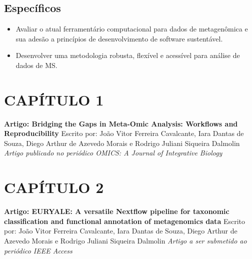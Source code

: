 \documentclass[
	12pt,				%
	oneside,			%
	a4paper,			%
	chapter=TITLE,		%
	section=TITLE,		%
	english,			%
	brazil				%
	]{abntex2}
\begin{document}
\section{Específicos}\label{especuxedficos}
\begin{itemize}
\tightlist
\item
  Avaliar o atual ferramentário computacional para dados de metagenômica e sua adesão a princípios de desenvolvimento de software sustentável.
\item
  Desenvolver uma metodologia robusta, flexível e acessível para análise de dados de \gls{MS}.
\end{itemize}
\chapter*{CAPÍTULO 1}\label{cap1}
\begin{center}
\textbf{Artigo: Bridging the Gaps in Meta-Omic Analysis: Workflows and Reproducibility}
\bigskip\newline
Escrito por: João Vitor Ferreira Cavalcante, Iara Dantas de Souza, Diego Arthur de Azevedo Morais e Rodrigo Juliani Siqueira Dalmolin
\bigskip\newline
\textit{Artigo publicado no periódico OMICS: A Journal of Integrative Biology}

\end{center}
\begin{fichacatalografica}
    
\end{fichacatalografica}
\chapter*{CAPÍTULO 2}\label{cap2}
\begin{center}
\textbf{Artigo: EURYALE: A versatile Nextflow pipeline for taxonomic classification and functional annotation of metagenomics data}
\bigskip\newline
Escrito por: João Vitor Ferreira Cavalcante, Iara Dantas de Souza, Diego Arthur de Azevedo Morais e Rodrigo Juliani Siqueira Dalmolin
\bigskip\newline
\textit{Artigo a ser submetido ao periódico IEEE Access}

\end{center}
\begin{fichacatalografica}
    
\end{fichacatalografica}
\end{document}
